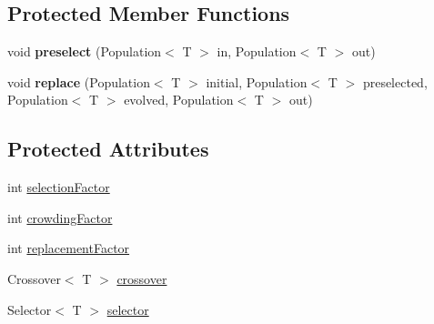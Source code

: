 \subsection*{Protected Member Functions}
\begin{CompactItemize}
\item 
\hypertarget{classjenes_1_1stage_1_1operator_1_1common_1_1_multi_niche_crowder_3_01_t_01extends_01_chromosome_01_4_e3e96b6cd96f375209e9308bb7f9ca85}{
void \textbf{preselect} (Population$<$ T $>$ in, Population$<$ T $>$ out)}
\label{classjenes_1_1stage_1_1operator_1_1common_1_1_multi_niche_crowder_3_01_t_01extends_01_chromosome_01_4_e3e96b6cd96f375209e9308bb7f9ca85}

\item 
\hypertarget{classjenes_1_1stage_1_1operator_1_1common_1_1_multi_niche_crowder_3_01_t_01extends_01_chromosome_01_4_619884821dabf179aed435269366114e}{
void \textbf{replace} (Population$<$ T $>$ initial, Population$<$ T $>$ preselected, Population$<$ T $>$ evolved, Population$<$ T $>$ out)}
\label{classjenes_1_1stage_1_1operator_1_1common_1_1_multi_niche_crowder_3_01_t_01extends_01_chromosome_01_4_619884821dabf179aed435269366114e}

\end{CompactItemize}
\subsection*{Protected Attributes}
\begin{CompactItemize}
\item 
int \hyperlink{classjenes_1_1stage_1_1operator_1_1common_1_1_multi_niche_crowder_3_01_t_01extends_01_chromosome_01_4_b561927a8af185e69bd5fcf85e904d7a}{selectionFactor}
\item 
int \hyperlink{classjenes_1_1stage_1_1operator_1_1common_1_1_multi_niche_crowder_3_01_t_01extends_01_chromosome_01_4_d7320907a72bd19c028f922383667560}{crowdingFactor}
\item 
int \hyperlink{classjenes_1_1stage_1_1operator_1_1common_1_1_multi_niche_crowder_3_01_t_01extends_01_chromosome_01_4_9a068eae86d3af67f89cfa4b244810fb}{replacementFactor}
\item 
Crossover$<$ T $>$ \hyperlink{classjenes_1_1stage_1_1operator_1_1common_1_1_multi_niche_crowder_3_01_t_01extends_01_chromosome_01_4_d584be099b23576ec3379a6867d31ef4}{crossover}
\item 
Selector$<$ T $>$ \hyperlink{classjenes_1_1stage_1_1operator_1_1common_1_1_multi_niche_crowder_3_01_t_01extends_01_chromosome_01_4_ec9f82fc79b7a63f5e664dfbcc7e9563}{selector}
\end{CompactItemize}


